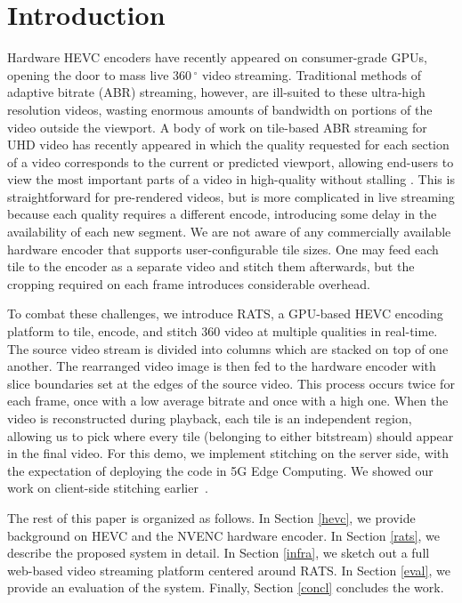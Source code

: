 
\section{Introduction} \label{intro}

Hardware HEVC encoders have recently appeared on consumer-grade GPUs, opening the door to mass live $360\,^{\circ}$ video streaming.
Traditional methods of adaptive bitrate (ABR) streaming, however, are ill-suited to these ultra-high resolution videos, wasting enormous amounts of bandwidth on portions of the video outside the viewport.
A body of work on tile-based ABR streaming for UHD video has recently appeared in which the quality requested for each section of a video corresponds to the current or predicted viewport, allowing end-users to view the most important parts of a video in high-quality without stalling \cite{lefeuvre2016,corbillon2016,PetrangeliSHT17}. This is straightforward for pre-rendered videos, but is more complicated in live streaming because each quality requires a different encode, introducing some delay in the availability of each new segment. We are not aware of any commercially available hardware encoder that supports user-configurable tile sizes. One may feed each tile to the encoder as a separate video and stitch them afterwards, but the cropping required on each frame introduces considerable overhead.

To combat these challenges, we introduce RATS, a GPU-based HEVC encoding platform to tile, encode, and stitch 360 video at multiple qualities in real-time. The source video stream is divided into columns which are stacked on top of one another. The rearranged video image is then fed to the hardware encoder with slice boundaries set at the edges of the source video. This process occurs twice for each frame, once with a low average bitrate and once with a high one. When the video is reconstructed during playback, each tile is an independent region, allowing us to pick where every tile (belonging to either bitstream) should appear in the final video. For this demo, we implement stitching on the server side, with the expectation of deploying the code in 5G Edge Computing.
We showed our work on client-side stitching earlier~\cite{ism-2018}.

The rest of this paper is organized as follows. In Section \ref{hevc}, we provide background on HEVC and the NVENC hardware encoder. In Section \ref{rats}, we describe the proposed system in detail. In Section \ref{infra}, we sketch out a full web-based video streaming platform centered around RATS. In Section \ref{eval}, we provide an evaluation of the system. Finally, Section \ref{concl} concludes the work.

